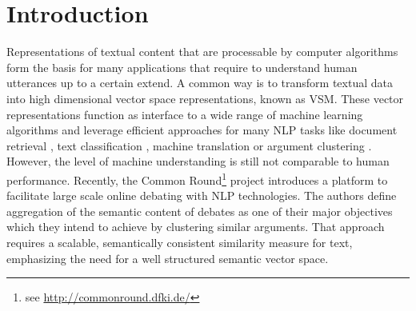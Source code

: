 \section{Introduction} %

Representations of textual content that are processable by computer algorithms form the basis for many applications that require to understand human utterances up to a certain extend. A common way is to transform textual data into high dimensional vector space representations, known as \ac{VSM}\autocite{salton_vector_1975}. These vector representations function as interface to a wide range of machine learning algorithms and leverage efficient approaches for many \ac{NLP} tasks like document retrieval \autocite{manning_introduction_2008}, text classification \autocite{sahami_bayesian_1998}, machine translation \autocite{wu_googles_2016} or argument clustering \autocite{boltuzic_identifying_2015}.  However, the level of machine understanding is still not comparable to human performance. Recently, the Common Round\footnote{see \url{http://commonround.dfki.de/}} project \autocite{uszkoreit_common_2017} introduces a platform to facilitate large scale online debating with \ac{NLP} technologies. The authors define aggregation of the semantic content of debates as one of their major objectives which they intend to achieve by clustering similar arguments. That approach requires a scalable, semantically consistent similarity measure for text, emphasizing the need for a well structured semantic vector space. 

